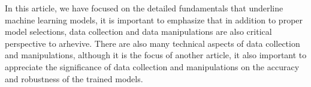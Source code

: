 
\par
In this article, we have focused on the detailed fundamentals that underline machine learning models, it is important to emphasize that in addition to proper model selections, data collection and data manipulations are also critical perspective to arhevive. There are also many technical aspects of data collection and manipulations, although it is the focus of another article, it also important to appreciate the significance of data collection and manipulations on the accuracy and robustness of the trained models.
\par 
